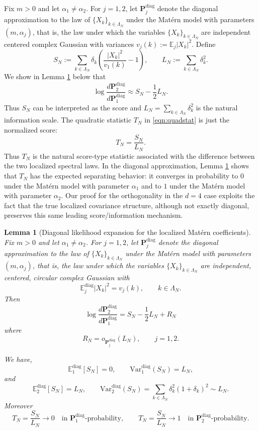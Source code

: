 \documentclass[11pt, reqno]{amsart}
\newtheorem{lemma}{Lemma}
\theoremstyle{remark}
\newcommand{\E}{\mathbb{E}}
\newcommand{\1}{\mathbf{1}}
\newcommand{\Var}{\mathrm{Var}}
\begin{document}
Fix \(m>0\) and let \(\alpha_1\neq \alpha_2\). For \(j=1,2\), let
\(\mathbf P_j^{\mathrm{diag}}\) denote the diagonal approximation to the law of
\(\{X_k\}_{k\in\Lambda_N}\) under the Mat\'ern model with parameters
\((m,\alpha_j)\), that is, the law under which the variables
\(\{X_k\}_{k\in\Lambda_N}\) are independent centered complex Gaussian with
variances
$
v_j(k):=\E_j|X_k|^2 .
$
Define
\[
S_N:=\sum_{k\in\Lambda_N}\delta_k
\left(\frac{|X_k|^2}{v_1(k)}-1\right),
\qquad
L_N:=\sum_{k\in\Lambda_N}\delta_k^2.
\]
We show in Lemma \ref{lem:matdiag} below that
\begin{equation}\label{eq:matern-diagonal-llr}
\log\frac{d\mathbf P_2^{\mathrm{diag}}}{d\mathbf P_1^{\mathrm{diag}}}
\approx
S_N-\frac12L_N.
\end{equation}
Thus $S_N$ can be interpreted as the score and $L_N = \sum_{k\in\Lambda_N}\delta_k^2$ is the 
natural information scale. 
The quadratic statistic $T_N$ in \eqref{eqn:quadstat} is just the normalized score:
\begin{equation}\label{eq:TN-score}
T_N=\frac{S_N}{L_N}.
\end{equation}
Thus \(T_N\) is the natural score-type statistic associated with the
difference between the two localized spectral laws. 
In the diagonal approximation, Lemma \ref{lem:matdiag} shows that \(T_N\) has the expected separating behavior:
it converges in probability to \(0\) under the Mat\'ern model with parameter \(\alpha_1\)
and to \(1\) under the Mat\'ern model with parameter \(\alpha_2\).  Our proof for the orthogonality in the $d=4$ case exploits the fact that the true localized covariance structure, although not exactly diagonal,
preserves this same leading score/information mechanism.
\begin{lemma}[Diagonal likelihood expansion for the localized Mat\'ern coefficients]
\label{lem:matdiag}
Fix \(m>0\) and let \(\alpha_1\neq \alpha_2\). For \(j=1,2\), let \(\mathbf P_j^{\mathrm{diag}}\) denote the diagonal approximation
to the law of \(\{X_k\}_{k\in\Lambda_N}\) under the Mat\'ern model with parameters
\((m,\alpha_j)\), that is, the law under which the variables
\(\{X_k\}_{k\in\Lambda_N}\) are independent, centered, circular complex Gaussian with
\[
\E_j^{\mathrm{diag}} |X_k|^2 = v_j(k), \qquad k\in\Lambda_N.
\]
Then
\begin{equation}\label{eq:matern-diagonal-llr}
\log\frac{d\mathbf P_2^{\mathrm{diag}}}{d\mathbf P_1^{\mathrm{diag}}}
=
S_N-\frac12L_N+R_N
\end{equation}
where
\[
R_N=o_{\mathbf P_j^{\mathrm{diag}}}(L_N), \qquad j=1,2.
\]

We have,
\[
\E_1^{\mathrm{diag}}[S_N]=0,
\qquad
\Var_1^{\mathrm{diag}}(S_N)=L_N,
\]
and
\[
\E_2^{\mathrm{diag}}[S_N]=L_N,
\qquad
\Var_2^{\mathrm{diag}}(S_N)
=
\sum_{k\in\Lambda_N}\delta_k^2(1+\delta_k)^2 \sim L_N.
\]
Moreover
\[
T_N=\frac{S_N}{L_N}\to 0
\quad\text{in \(\mathbf P_1^{\mathrm{diag}}\)-probability},
\qquad
T_N=\frac{S_N}{L_N}\to 1
\quad\text{in \(\mathbf P_2^{\mathrm{diag}}\)-probability}.
\]
\end{lemma}
\end{document}

